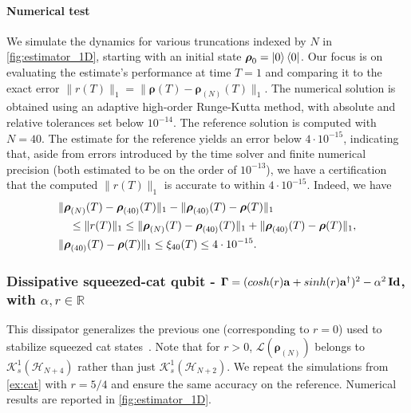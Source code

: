 \documentclass[a4paper,onecolumn,amsmath,amssymb,amsfonts,accepted=2026-03-06]{quantumarticle}
\newcommand{\xL}{\mathcal{L}}
\newcommand{\Id}{\operatorname{\mathbf{Id}}}
\newcommand{\xH}{\mathcal{H}}
\newcommand{\xK}{\mathcal{K}}
\newcommand{\LL}{{\mathbf{\Gamma}}}
\newcommand{\destroy}{{\bf a}}
\newcommand{\create}{{\bf a^\dag}}
\newcommand{\rN}{{\boldsymbol{\rho}_{(N)}}}
\begin{document}
\paragraph{Numerical test}

We simulate the dynamics for various truncations indexed by $N$ in \cref{fig:estimator_1D}, starting with an initial state $\boldsymbol{\rho}_0 = \ket{0}\bra{0}$. Our focus is on evaluating the estimate's performance at time $T = 1$ and comparing it to the exact error $\|r(T)\|_1 = \|\boldsymbol{\rho}(T) - \rN(T)\|_1$. The numerical solution is obtained using an adaptive high-order Runge-Kutta method, with absolute and relative tolerances set below $10^{-14}$. The reference solution is computed with $N = 40$. The estimate for the reference yields an error below $ 4 \cdot 10^{-15}$, indicating that, aside from errors introduced by the time solver and finite numerical precision (both estimated to be on the order of $10^{-13}$), we have a certification that the computed $\|r(T)\|_1$ is accurate to within $4 \cdot 10^{-15}$. Indeed, we have 
\begin{align}
    \notag &\|\rN(T)-\boldsymbol{\rho}_{(40)}(T) \|_1 - \|\boldsymbol{\rho}_{(40)}(T)-\boldsymbol{\rho}(T)\|_1\notag\\
    &\quad\leq\|r(T)\|_1 \leq \|\rN(T)-\boldsymbol{\rho}_{(40)}(T) \|_1 + \|\boldsymbol{\rho}_{(40)}(T)-\boldsymbol{\rho}(T)\|_1, \\
    &\|\boldsymbol{\rho}_{(40)}(T)-\boldsymbol{\rho}(T)\|_1 \leq \xi_{40}(T) \leq 4 \cdot 10^{-15}.
\end{align}


\subsubsection{\texorpdfstring{Dissipative squeezed-cat qubit  - $\LL = (cosh(r)\destroy + sinh(r)\create)^2 - \alpha^2 \Id$, with $\alpha, r \in \mathbb{R}$}{Dissipative squeezed-cat qubit }}
\label{ex:squeezecat}
This dissipator generalizes the previous one (corresponding to $r=0$) used to stabilize squeezed cat states~\cite{Hillmann_2023}. Note that for $r>0$, $\xL(\rN)$ belongs to $\xK^1_s(\xH_{N+4})$ rather than just $\xK^1_s(\xH_{N+2})$.
We repeat the simulations from \cref{ex:cat} with $r=5/4$ and ensure the same accuracy on the reference. Numerical results are reported in \cref{fig:estimator_1D}.
\end{document}
